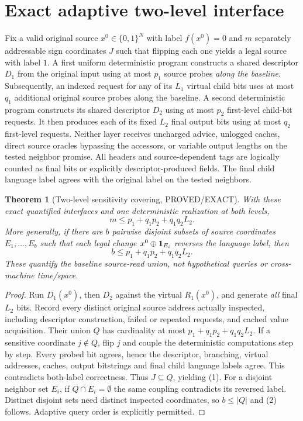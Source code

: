 \documentclass[11pt]{article}
\newtheorem{theorem}{Theorem}
\begin{document}
\section{Exact adaptive two-level interface}
Fix a valid original source $x^0\in\{0,1\}^N$ with label $f(x^0)=0$ and $m$ separately addressable sign coordinates $J$ such that flipping each one yields a legal source with label $1$. A first uniform deterministic program constructs a shared descriptor $D_1$ from the original input using at most $p_1$ source probes \emph{along the baseline}. Subsequently, an indexed request for any of its $L_1$ virtual child bits uses at most $q_1$ additional original source probes along the baseline. A second deterministic program constructs its shared descriptor $D_2$ using at most $p_2$ first-level child-bit requests. It then produces each of its fixed $L_2$ final output bits using at most $q_2$ first-level requests. Neither layer receives uncharged advice, unlogged caches, direct source oracles bypassing the accessors, or variable output lengths on the tested neighbor promise. All headers and source-dependent tags are logically counted as final bits or explicitly descriptor-produced fields. The final child language label agrees with the original label on the tested neighbors.

\begin{theorem}[Two-level sensitivity covering, PROVED/EXACT]\label{th:cover}
With these exact quantified interfaces and one deterministic realization at both levels,
\[
\boxed{m\le p_1+q_1p_2+q_1q_2L_2.}\tag{1}
\]
More generally, if there are $b$ pairwise disjoint subsets of source coordinates $E_1,\ldots,E_b$ such that each legal change $x^0\oplus{\bf 1}_{E_i}$ reverses the language label, then
\[
\boxed{b\le p_1+q_1p_2+q_1q_2L_2.}\tag{2}
\]
These quantify the baseline source-read union, not hypothetical queries or cross-machine time/space.
\end{theorem}
\begin{proof}
Run $D_1(x^0)$, then $D_2$ against the virtual $R_1(x^0)$, and generate \emph{all} final $L_2$ bits. Record every distinct original source address actually inspected, including descriptor construction, failed or repeated requests, and cached value acquisition. Their union $Q$ has cardinality at most $p_1+q_1p_2+q_1q_2L_2$. If a sensitive coordinate $j\notin Q$, flip $j$ and couple the deterministic computations step by step. Every probed bit agrees, hence the descriptor, branching, virtual addresses, caches, output bitstrings and final child language labels agree. This contradicts both-label correctness. Thus $J\subseteq Q$, yielding (1). For a disjoint neighbor set $E_i$, if $Q\cap E_i=\emptyset$ the same coupling contradicts its reversed label. Distinct disjoint sets need distinct inspected coordinates, so $b\le|Q|$ and (2) follows. Adaptive query order is explicitly permitted.
\end{proof}
\end{document}
